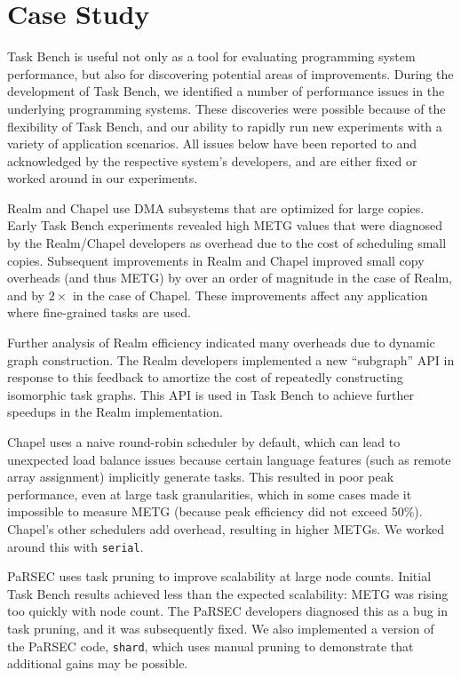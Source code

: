 \section{Case Study}
\label{sec:case-study}

Task Bench is useful not only as a tool for evaluating programming
system performance, but also for discovering potential areas of
improvements. During the development of Task Bench, we identified a
number of performance issues in the underlying programming
systems. These discoveries were possible because of the flexibility of
Task Bench, and our ability to rapidly run new experiments with a
variety of application scenarios. All issues below have been reported
to and acknowledged by the respective system's developers, and are
either fixed or worked around in our experiments.

Realm and Chapel use DMA subsystems that are optimized for large
copies. Early Task Bench experiments revealed high METG values that
were diagnosed by the Realm/Chapel developers as overhead due to the
cost of scheduling small copies. Subsequent improvements in Realm and
Chapel improved small copy overheads (and thus METG) by over an order
of magnitude in the case of Realm, and by $2\times$ in the case of
Chapel. These improvements affect any application where fine-grained
tasks are used.

Further analysis of Realm efficiency indicated many overheads due to
dynamic graph construction. The Realm developers implemented a new
``subgraph'' API in response to this feedback to amortize the cost of
repeatedly constructing isomorphic task graphs. This API is used in
Task Bench to achieve further speedups in the Realm implementation.

Chapel uses a naive round-robin scheduler by default, which can lead
to unexpected load balance issues because certain language features
(such as remote array assignment) implicitly generate tasks. This
resulted in poor peak performance, even at large task granularities,
which in some cases made it impossible to measure METG (because peak
efficiency did not exceed 50\%). Chapel's other schedulers add
overhead, resulting in higher METGs. We worked around this with
\lstinline{serial}.

PaRSEC uses task pruning to improve scalability at large node
counts. Initial Task Bench results achieved less than the expected
scalability: METG was rising too quickly with node count.  The PaRSEC
developers diagnosed this as a bug in task pruning, and it was
subsequently fixed. We also implemented a version of the PaRSEC code,
\lstinline{shard}, which uses manual pruning to demonstrate that
additional gains may be possible.

